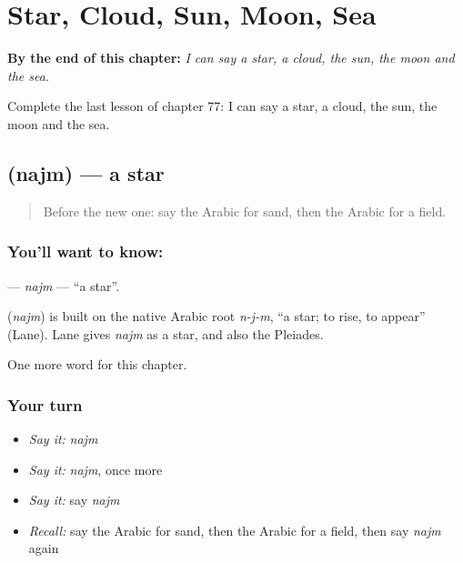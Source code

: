 
\chapter{Star, Cloud, Sun, Moon, Sea}
\label{ch:ar-star-cloud-sun-moon-sea}

\begin{chapteropening}
\textbf{By the end of this chapter:} \emph{I can say a star, a cloud, the sun, the moon and the sea.}

Complete the last lesson of chapter 77: I can say a star, a cloud, the sun, the moon and the sea.
\end{chapteropening}

\section[\texorpdfstring{\ar{نجم} (najm)}{نجم (najm)}]{ (najm) — a star}

\label{lesson:AR-C77-najm}



\begin{quote}
Before the new one: say the Arabic for sand, then the Arabic for a field.
\end{quote}

\subsection*{You'll want to know: }
\textbf{} — \emph{najm} — \textquotedblleft{}a star\textquotedblright{}.

\begin{cousinweb}
\textbf{} (\emph{najm}) is built on the native Arabic root \emph{n-j-m}, \textquotedblleft{}a star; to rise, to appear\textquotedblright{} (Lane). Lane gives \emph{najm} as a star, and also the Pleiades.
\end{cousinweb}

\begin{grammarlens}[title={What you've built}]
One more word for this chapter.
\end{grammarlens}

\subsection*{Your turn}
\begin{itemize}
\raggedright
  \item \emph{Say it:} \emph{najm}
  \item \emph{Say it:} \emph{najm}, once more
  \item \emph{Say it:} say \emph{najm}
  \item \emph{Recall:} say the Arabic for sand, then the Arabic for a field, then say \emph{najm} again
\end{itemize}

